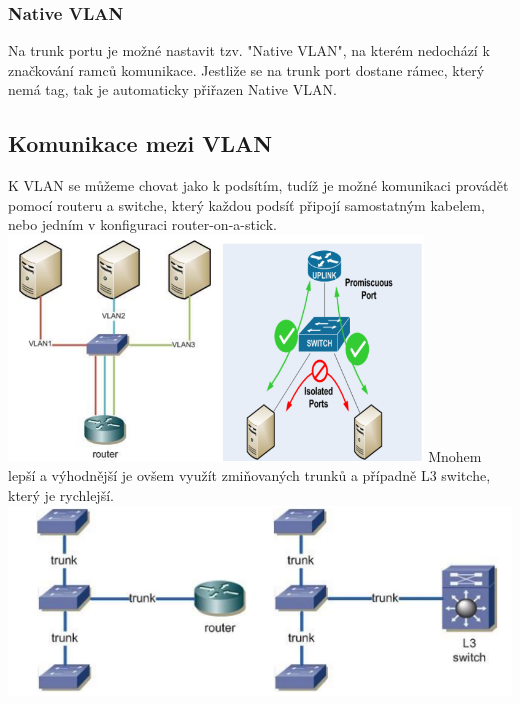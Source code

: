 \subsubsection{Native VLAN}
Na trunk portu je možné nastavit tzv. "Native VLAN", na kterém nedochází k značkování ramců komunikace.
Jestliže se na trunk port dostane rámec, který nemá tag, tak je automaticky přiřazen Native VLAN.
\subsection{Komunikace mezi VLAN}
K VLAN se můžeme chovat jako k podsítím, tudíž je možné komunikaci provádět pomocí routeru a switche, který každou podsíť připojí samostatným kabelem, nebo jedním v konfiguraci router-on-a-stick. \\
\includegraphics[width=\linewidth, height=6cm]{TVY-POS/VLAN/VLAN-router.png}
Mnohem lepší a výhodnější je ovšem využít zmiňovaných trunků a případně L3 switche, který je rychlejší.
\includegraphics[width=\linewidth]{TVY-POS/VLAN/VLAN-trunk.png}
